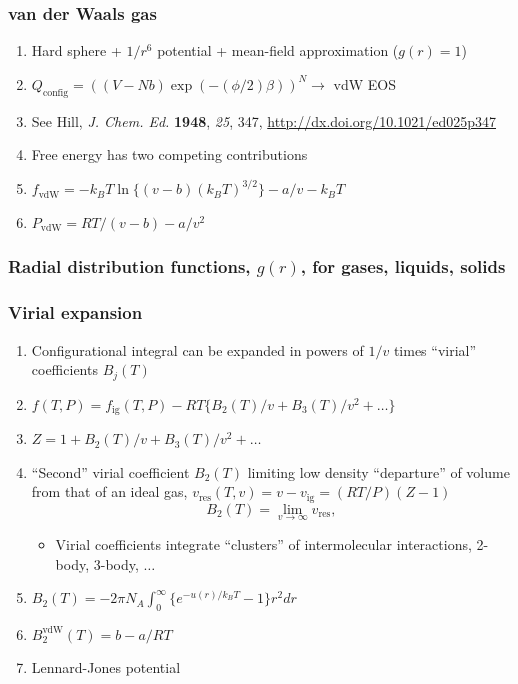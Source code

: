 \documentclass[11pt]{article}
\begin{document}
\subsubsection{van der Waals gas}
\label{sec:org083b31a}
\begin{enumerate}
\item Hard sphere + \(1/r^6\) potential + mean-field approximation (\(g(r)=1\))
\item \(Q_\mathrm{config} = ((V-Nb) \exp (-(\phi/2)\beta))^N \rightarrow\) vdW EOS
\item See Hill, \emph{J. Chem. Ed.} \textbf{1948}, \emph{25}, 347, \url{http://dx.doi.org/10.1021/ed025p347}
\item Free energy has two competing contributions
\item \(f_\text{vdW} = - k_BT \ln \{ (v-b)(k_BT)^{3/2}\} -a/v -k_BT\)
\item \(P_\text{vdW}=RT/(v-b) - a/v^2\)
\end{enumerate}

\subsubsection{Radial distribution functions, \(g(r)\), for gases, liquids, solids}
\label{sec:org416cebd}
\subsubsection{Virial expansion}
\label{sec:orgb3b1303}
\begin{enumerate}
\item Configurational integral can be expanded in powers of \(1/v\) times ``virial''
coefficients \(B_j(T)\)
\item \(f(T,P) = f_\text{ig}(T,P) - RT \{ B_2(T)/v + B_3(T)/v^2 + \ldots \}\)
\item \(Z = 1 + B_2(T)/v + B_3(T)/v^2 + \dots\)
\item ``Second'' virial coefficient \(B_2(T)\) limiting low density ``departure'' of
volume from that of an ideal gas, \(v_\text{res}(T,v) = v -
     v_\text{ig}=(RT/P)(Z-1)\)
	\[B_2(T) = \lim_{v \rightarrow \infty} v_\text{res}, \]
\begin{itemize}
\item Virial coefficients integrate ``clusters'' of intermolecular interactions, 2-body, 3-body, \(\ldots\)
\end{itemize}
\item \(B_2(T) = -2\pi N_A \int_0^\infty \{e^{-u(r)/k_BT}-1\}r^2dr\)
\item \(B_2^\text{vdW} (T) = b -a/RT\)
\item Lennard-Jones potential
\end{enumerate}
\end{document}
